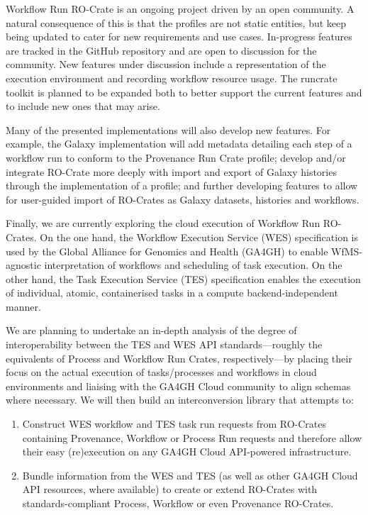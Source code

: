 Workflow Run RO-Crate is an ongoing project driven by an open community.
A natural consequence of this is that the profiles are not static entities, but keep being updated to cater for new requirements and use cases.
In-progress features are tracked in the GitHub repository   and are open to discussion for the community.
New features under discussion include a representation of the execution environment and recording workflow resource usage.
The runcrate toolkit is planned to be expanded both to better support the current features and to include new ones that may arise.

Many of the presented implementations will also develop new features. For example, the Galaxy implementation will add metadata detailing each step of a workflow run to conform to the Provenance Run Crate profile; develop and/or integrate RO-Crate more deeply with import and export of Galaxy histories through the implementation of a profile; and further developing features to allow for user-guided import of RO-Crates as Galaxy datasets, histories and workflows.

Finally, we are currently exploring the cloud execution of Workflow Run RO-Crates.
On the one hand, the Workflow Execution Service (WES) specification is used by the Global Alliance for Genomics and Health (GA4GH) \cite{Rehm 2021} to enable WfMS-agnostic interpretation of workflows and scheduling of task execution. On the other hand, the Task Execution Service (TES) specification enables the execution of individual, atomic, containerised tasks in a compute backend-independent manner.

We are planning to undertake an in-depth analysis of the degree of interoperability between the TES and WES API standards---roughly the equivalents of Process and Workflow Run Crates, respectively---by placing their focus on the actual execution of tasks/processes and workflows in cloud environments and liaising with the GA4GH Cloud community to align schemas where necessary.
We will then build an interconversion library that attempts to:

\begin{enumerate}[(1)]
  \item Construct WES workflow and TES task run requests from RO-Crates containing Provenance, Workflow or Process Run requests and therefore allow their easy (re)execution on any GA4GH Cloud API-powered infrastructure.
  \item Bundle information from the WES and TES (as well as other GA4GH Cloud API resources, where available) to create or extend RO-Crates with standards-compliant Process, Workflow or even Provenance RO-Crates.
\end{enumerate}
